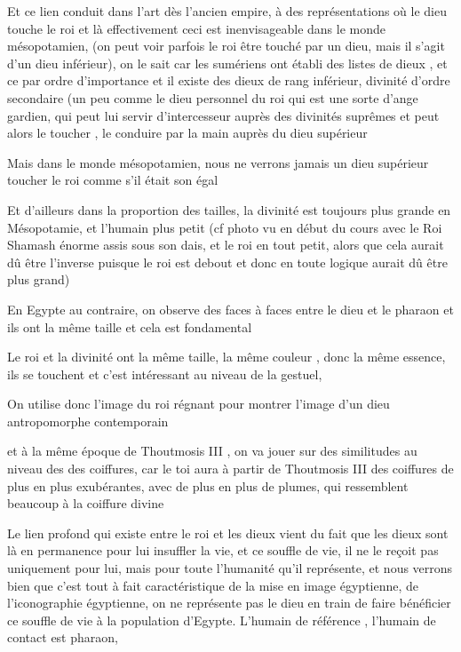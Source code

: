 \documentclass[a4paper,10pt]{article}
\begin{document}
\begin{itemize}
  [Warning: Image ignored] %
 

Et ce lien conduit dans l'art dès
l'ancien empire, à des représentations où le dieu
touche le roi et là effectivement ceci est inenvisageable dans le monde
mésopotamien, (on peut voir parfois le roi être touché par un dieu,
mais il s'agit d'un dieu inférieur),
on le sait car les sumériens ont établi des listes de dieux , et ce par
ordre d'importance et il existe des dieux de rang
inférieur, divinité d'ordre secondaire (un peu comme
le dieu personnel du roi qui est une sorte d'ange
gardien, qui peut lui servir d'intercesseur auprès des
divinités suprêmes et peut alors le toucher , le conduire par la main
auprès du dieu supérieur

Mais dans le monde mésopotamien, nous ne verrons jamais un dieu
supérieur toucher le roi comme s'il était son égal

Et d'ailleurs dans la proportion des tailles, la
divinité est toujours plus grande en Mésopotamie, et
l'humain plus petit  (cf photo vu en début du cours
avec le Roi Shamash énorme assis sous son dais, et le roi en tout
petit,  alors que cela aurait dû être l'inverse
puisque le roi est debout et donc en toute logique aurait dû être plus
grand)

En Egypte au contraire, on observe des faces à faces entre le dieu et le
pharaon et ils ont la même taille et cela est fondamental 

Le roi et la divinité ont la même taille, la même couleur , donc la même
essence, ils se touchent et c'est intéressant au
niveau de la gestuel, 

On utilise donc l'image du roi régnant pour montrer
l'image d'un dieu antropomorphe
contemporain

et à la même époque de Thoutmosis III , on va jouer sur des similitudes
au niveau des des coiffures, car le toi aura à partir de Thoutmosis III
des coiffures de plus en plus exubérantes, avec de plus en plus de
plumes, qui ressemblent beaucoup à la coiffure divine

Le lien  profond qui existe entre le roi et les dieux vient du fait que
les dieux sont là en permanence pour lui insuffler la vie, et ce
souffle de vie, il ne le reçoit pas uniquement pour lui, mais pour
toute l'humanité qu'il représente, et
nous verrons bien que c'est tout à fait
caractéristique de la mise en image égyptienne, de
l'iconographie égyptienne, on ne représente pas le
dieu en train de faire bénéficier ce souffle de vie à  la population
d'Egypte. L'humain de référence ,
l'humain de contact est pharaon, 


\end{itemize}
\end{document}
